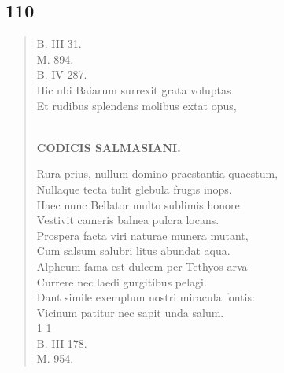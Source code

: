 \documentclass[11pt, a4paper]{report}
\begin{document}
            \subsection*{110}
      \begin{verse}
      B. III 31. \\ M. 894. \\ B. IV 287. \\ Hic ubi Baiarum surrexit grata voluptas \\ Et rudibus splendens molibus extat opus, \\ 
        ﻿\pagebreak 
    \begin{center} \textbf{CODICIS SALMASIANI.} \end{center} \marginpar{[129]} Rura prius, nullum domino praestantia quaestum, \\ Nullaque tecta tulit glebula frugis inops. \\ Haec nunc Bellator multo sublimis honore \\ Vestivit cameris balnea pulcra locans. \\ Prospera facta viri naturae munera mutant, \\ Cum salsum salubri litus abundat aqua. \\ Alpheum fama est dulcem per Tethyos arva \\ Currere nec laedi gurgitibus pelagi. \\ Dant simile exemplum nostri miracula fontis: \\ Vicinum patitur nec sapit unda salum. \\ 1 1 \\ B. III 178. \\ M. 954. \\ 
      \end{verse}
  
\end{document}
